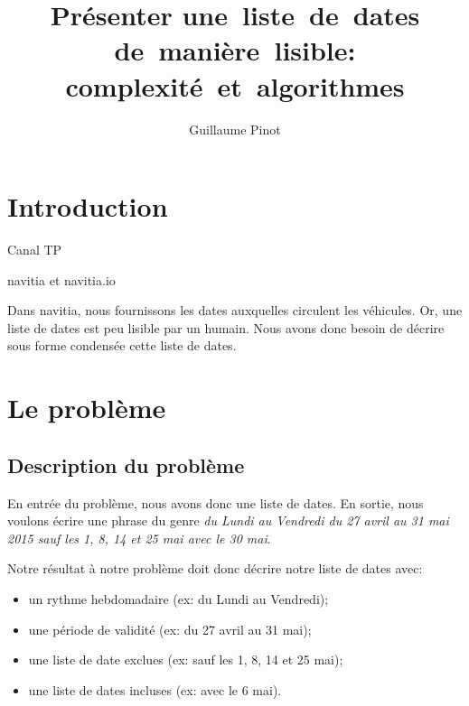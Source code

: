 \documentclass{roadef}
\begin{document}
\title{Présenter une~liste~de~dates de~manière~lisible: complexité~et~algorithmes}

\def\shorttitle{Présenter une~liste~de~dates de~manière~lisible}

\author{Guillaume Pinot}

{}

\maketitle
\thispagestyle{empty}



\section{Introduction}

Canal TP

navitia et navitia.io

Dans navitia, nous fournissons les dates auxquelles circulent les
véhicules.  Or, une liste de dates est peu lisible par un humain. Nous
avons donc besoin de décrire sous forme condensée cette liste de dates.

\section{Le problème}

\subsection{Description du problème}

En entrée du problème, nous avons donc une liste de dates.  En sortie,
nous voulons écrire une phrase du genre \emph{du Lundi au Vendredi du
  27 avril au 31 mai 2015 sauf les 1, 8, 14 et 25 mai avec le 30 mai}.

Notre résultat à notre problème doit donc décrire notre liste de dates
avec:
\begin{itemize}
\item un rythme hebdomadaire (ex: du Lundi au Vendredi);
\item une période de validité (ex: du 27 avril au 31 mai);
\item une liste de date exclues (ex: sauf les 1, 8, 14 et 25 mai);
\item une liste de dates incluses (ex: avec le 6 mai).
\end{itemize}
\end{document}
